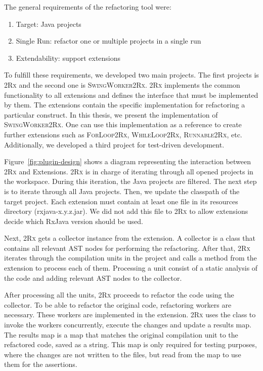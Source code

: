 \documentclass[type=bsc,accentcolor=tud9c]{tudthesis}
\newcommand{\framework}[1]{\textcolor{black!65}{#1}}
\newcommand{\toolcore}{\textsc{2Rx}}
\newcommand{\toolextension}{\textsc{SwingWorker2Rx}}
\begin{document}
The general requirements of the refactoring tool were:
\begin{enumerate}
	\item Target: \framework{Java} projects
	\item Single Run: refactor one or multiple projects in a single run
	\item Extendability: support extensions
\end{enumerate}

To fulfill these requirements, we developed two main projects. The first projects is \toolcore{} and the second one is \toolextension{}. \toolcore{} implements the common functionality to all extensions and defines the interface that must be implemented by them. The extensions contain the specific implementation for refactoring a particular construct. In this thesis, we present the implementation of \toolextension{}. One can use this implementation as a reference to create further extensions such as \textsc{ForLoop2Rx}, \textsc{WhileLoop2Rx}, \textsc{Runnable2Rx}, etc. Additionally, we developed a third project for test-driven development.

Figure~\ref{fig:plugin-design} shows a diagram representing the interaction between \toolcore{} and Extensions. \toolcore{} is in charge of iterating through all opened projects in the workspace. During this iteration, the \framework{Java} projects are filtered. The next step is to iterate through all \framework{Java} projects. Then, we update the classpath of the target project. Each extension must contain at least one  file in its resources directory (rxjava-x.y.z.jar). We did not add this  file to \toolcore{} to allow extensions decide which \framework{RxJava} version should be used.

Next, \toolcore{} gets a collector instance from the extension. A collector is a class that contains all relevant AST nodes for performing the refactoring. After that, \toolcore{} iterates through the compilation units in the project and calls a method from the extension to process each of them. Processing a unit consist of a static analysis of the code and adding relevant AST nodes to the collector.

After processing all the units, \toolcore{} proceeds to refactor the code using the collector. To be able to refactor the original code, refactoring workers are necessary. These workers are implemented in the extension. \toolcore{} uses the class  to invoke the workers concurrently, execute the changes and update a results map. The results map is a map that matches the original compilation unit to the refactored code, saved as a string. This map is only required for testing purposes, where the changes are not written to the files, but read from the map to use them for the assertions.
\end{document}
